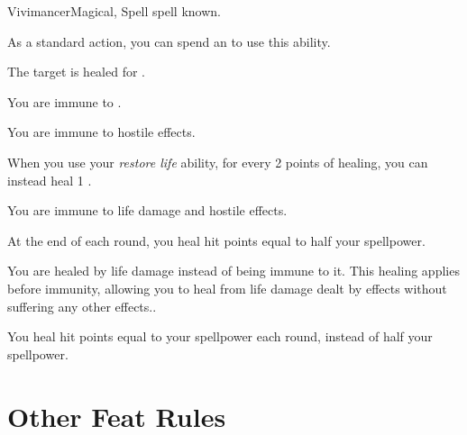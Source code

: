     \begin{feat}{Vivimancer}{Magical, Spell}
        \featpre {} spell known.
        \featben

         As a standard action, you can spend an  to use this ability.
        \begin{ability}
            \begin{spelltargetinginfo}
            \end{spelltargetinginfo}
            \begin{spelleffects}
                \spelleffect The target is healed for \spelldamage{}.
            \end{spelleffects}
        \end{ability}

         You are immune to .

         You are immune to hostile  effects.

         When you use your \textit{restore life} ability, for every 2 points of healing, you can instead heal 1 .

         You are immune to life damage and hostile  effects.

         At the end of each round, you heal hit points equal to half your spellpower.

         You are healed by life damage instead of being immune to it.
        This healing applies before immunity, allowing you to heal from life damage dealt by  effects without suffering any other effects..

         You heal hit points equal to your spellpower each round, instead of half your spellpower.
    \end{feat}

\section{Other Feat Rules}

